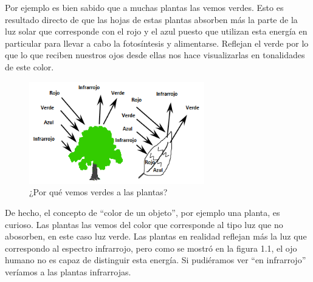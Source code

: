 \documentclass[11pt,spanish]{article}
\begin{document}
Por ejemplo es bien sabido que a muchas plantas las vemos verdes. Esto es resultado directo de que las hojas de estas plantas absorben más la parte de la luz solar que corresponde con el rojo y el azul puesto que utilizan esta energía en particular para llevar a cabo la fotosíntesis y alimentarse. Reflejan el verde por lo que lo que reciben nuestros ojos desde ellas nos hace visualizarlas en tonalidades de este color.


\begin{figure}[h!]
\begin{center}
\leavevmode
\includegraphics[width=3in]{4_plantas.png}
\end{center}
\caption{¿Por qué vemos verdes a las plantas?}
\end{figure}


\newpage

De hecho, el concepto de "`color de un objeto"', por ejemplo una planta, es curioso.  Las plantas las vemos del color que corresponde al tipo luz que no abosorben, en este caso luz verde. Las plantas en realidad reflejan más la luz que correspondo al espectro infrarrojo, pero como se mostró en la figura 1.1, el ojo humano no es capaz de distinguir esta energía. Si pudiéramos ver "`en infrarrojo"' veríamos a las plantas infrarrojas. 
\end{document}
